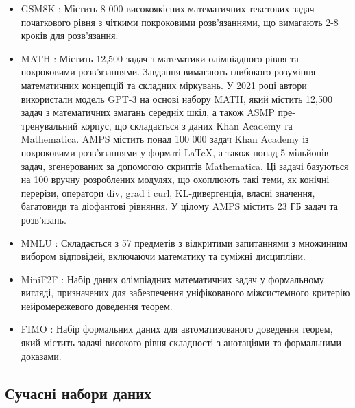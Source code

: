 \begin{itemize}

    \item {GSM8K} \cite{cobbe2021trainingverifierssolvemath}: Містить 8 000 високоякісних математичних текстових задач початкового рівня з чіткими покроковими розв'язаннями, що вимагають 2-8 кроків для розв'язання.
    
    \item {MATH} \cite{hendrycks2021measuringmathematicalproblemsolving}: Містить 12,500 задач з математики олімпіадного рівня та покроковими розв'язаннями. Завдання вимагають глибокого розуміння математичних концепцій та складних міркувань.
    У 2021 році автори використали модель GPT-3 на основі набору MATH, який містить 12,500 задач з математичних змагань середніх шкіл, а також ASMP пре-тренувальний корпус, що складається з даних Khan Academy та Mathematica. AMPS містить понад 100 000 задач Khan Academy із покроковими розв’язаннями у форматі LaTeX, а також понад 5 мільйонів задач, згенерованих за допомогою скриптів Mathematica. Ці задачі базуються на 100 вручну розроблених модулях, що охоплюють такі теми, як конічні перерізи, оператори div, grad і curl, KL-дивергенція, власні значення, багатовиди та діофантові рівняння. У цілому AMPS містить 23 ГБ задач та розв'язань.
    
    \item {MMLU} \cite{hendrycks2021measuringmassivemultitasklanguage}: Складається з 57 предметів з відкритими запитаннями з множинним вибором відповідей, включаючи математику та суміжні дисципліни.
    
    \item {MiniF2F} \cite{zheng2022minif2fcrosssystembenchmarkformal}: Набір даних олімпіадних математичних задач у формальному вигляді, призначених для забезпечення уніфікованого міжсистемного критерію нейромережевого доведення теорем.
    
    \item {FIMO} \cite{liu2023fimochallengeformaldataset}: Набір формальних даних для автоматизованого доведення теорем, який містить задачі високого рівня складності з анотаціями та формальними доказами.

\end{itemize}

\subsection{Сучасні набори даних}

